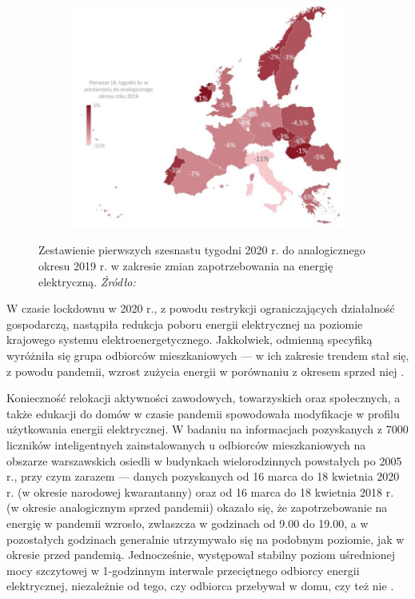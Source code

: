\documentclass[polish, twoside, 12pt, a4paper]{article}
\theoremstyle{definition}
\theoremstyle{plain}
\theoremstyle{remark}
\begin{document}
\begin{figure}[hbt]
  \centering

  \begin{subfigure}[t]{0.45\textwidth}
    \hspace{-1.8cm}
    \includegraphics[width=1.4\textwidth]{./out_figures/figure_6}
  \end{subfigure}

  \captionsetup{margin=10pt,font=small,labelfont=bf,width=.8\textwidth}

  \caption[Zmiany zapotrzebowania na energię elektryczną (16 tygodni)]{Zestawienie pierwszych szesnastu tygodni 2020 r. do analogicznego okresu 2019 r. w zakresie zmian zapotrzebowania na energię elektryczną. \textit{Źródło:} \cite{biuroanalizpfr2020}}\label{fig:x6}
\end{figure}

W czasie lockdownu w 2020 r., z powodu restrykcji ograniczających działalność gospodarczą, nastąpiła redukcja poboru energii elektrycznej na poziomie krajowego systemu elektroenergetycznego. Jakkolwiek, odmienną specyfiką wyróżniła się grupa odbiorców mieszkaniowych --- w ich zakresie trendem stał się, z powodu pandemii, wzrost zużycia energii w porównaniu z okresem sprzed niej \citep{artsmart2023}. 

Konieczność relokacji aktywności zawodowych, towarzyskich oraz społecznych, a także edukacji do domów w czasie pandemii spowodowała modyfikacje w profilu użytkowania energii elektrycznej. W badaniu na informacjach pozyskanych z 7000 liczników inteligentnych zainstalowanych u odbiorców mieszkaniowych na obszarze warszawskich osiedli w budynkach wielorodzinnych powstałych po 2005 r., przy czym zarazem --- danych pozyskanych od 16 marca do 18 kwietnia 2020 r. (w okresie narodowej kwarantanny) oraz od 16 marca do 18 kwietnia 2018 r. (w okresie analogicznym sprzed pandemii) okazało się, że zapotrzebowanie na energię w pandemii wzrosło, zwłaszcza w godzinach od 9.00 do 19.00, a w pozostałych godzinach generalnie utrzymywało się na podobnym poziomie, jak w okresie przed pandemią. Jednocześnie, występował stabilny poziom uśrednionej mocy szczytowej w 1-godzinnym interwale przeciętnego odbiorcy energii elektrycznej, niezależnie od tego, czy odbiorca przebywał w domu, czy też nie \citep{artsmart2023}. 
\end{document}

